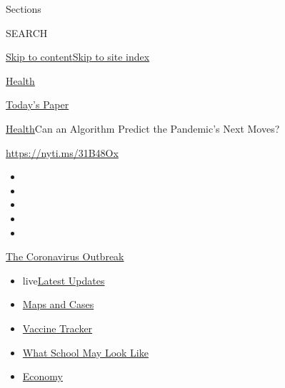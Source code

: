 Sections

SEARCH

\protect\hyperlink{site-content}{Skip to
content}\protect\hyperlink{site-index}{Skip to site index}

\href{https://www.nytimes.com/section/health}{Health}

\href{https://myaccount.nytimes.com/auth/login?response_type=cookie\&client_id=vi}{}

\href{https://www.nytimes.com/section/todayspaper}{Today's Paper}

\href{/section/health}{Health}\textbar{}Can an Algorithm Predict the
Pandemic's Next Moves?

\url{https://nyti.ms/31B48Ox}

\begin{itemize}
\item
\item
\item
\item
\item
\end{itemize}

\href{https://www.nytimes.com/news-event/coronavirus?action=click\&pgtype=Article\&state=default\&region=TOP_BANNER\&context=storylines_menu}{The
Coronavirus Outbreak}

\begin{itemize}
\tightlist
\item
  live\href{https://www.nytimes.com/2020/08/01/world/coronavirus-covid-19.html?action=click\&pgtype=Article\&state=default\&region=TOP_BANNER\&context=storylines_menu}{Latest
  Updates}
\item
  \href{https://www.nytimes.com/interactive/2020/us/coronavirus-us-cases.html?action=click\&pgtype=Article\&state=default\&region=TOP_BANNER\&context=storylines_menu}{Maps
  and Cases}
\item
  \href{https://www.nytimes.com/interactive/2020/science/coronavirus-vaccine-tracker.html?action=click\&pgtype=Article\&state=default\&region=TOP_BANNER\&context=storylines_menu}{Vaccine
  Tracker}
\item
  \href{https://www.nytimes.com/interactive/2020/07/29/us/schools-reopening-coronavirus.html?action=click\&pgtype=Article\&state=default\&region=TOP_BANNER\&context=storylines_menu}{What
  School May Look Like}
\item
  \href{https://www.nytimes.com/live/2020/07/31/business/stock-market-today-coronavirus?action=click\&pgtype=Article\&state=default\&region=TOP_BANNER\&context=storylines_menu}{Economy}
\end{itemize}

